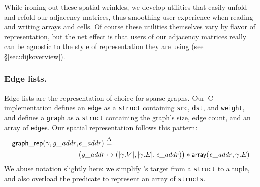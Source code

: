 While ironing out these spatial wrinkles, we develop utilities that easily
unfold and refold our adjacency matrices, thus smoothing user
experience when reading and writing arrays and cells. Of course
these utilities themselves vary by flavor of representation, but
the net effect is that users of our adjacency matrices really can
be agnostic to the style of representation they are using
(see \S\ref{sec:dijkoverview}).



\subsubsection{Edge lists.}

Edge lists are the representation of choice
for sparse graphs. Our~C implementation
defines an \texttt{edge} as a
\texttt{struct} containing \texttt{src}, \texttt{dst}, and
\texttt{weight}, and defines a \texttt{graph} as a
\texttt{struct} containing
the graph's size, edge count,
and an array of \texttt{edge}s. Our spatial representation
follows this pattern:
\vspace{-0.5em}
\begin{equation*}
\begin{split}
\mathsf{graph\_rep}(\gamma, \mathit{g\_addr}, &\mathit{e\_addr})~\mathbin{\stackrel{\Delta}{=}}~ \\
&\big(\mathit{g\_addr} \mapsto (\lvert\gamma.V\rvert, \lvert\gamma.E\rvert, \mathit{e\_addr})\big)
\ast
\mathsf{array}(\mathit{e\_addr},\gamma.E)
\end{split}
\end{equation*}
We abuse notation slightly here: we simplify 's target
from a \texttt{struct} to a tuple, and also overload the  predicate to represent
an array of \texttt{structs}.



